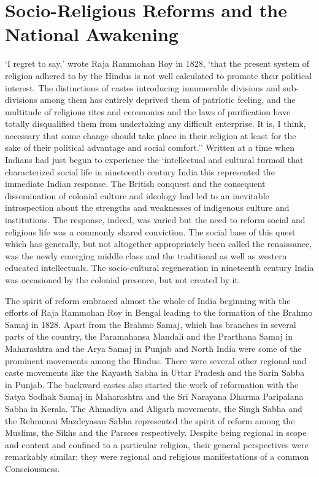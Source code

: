 
\chapter{Socio-Religious Reforms and the National Awakening}

`I regret to say,' wrote Raja Rammohan Roy in 1828, `that the present system of religion adhered to by the Hindus is not well calculated to promote their political interest. The distinctions of castes introducing innumerable divisions and sub-divisions among them has entirely deprived them of patriotic feeling, and the multitude of religious rites and ceremonies and the laws of purification have totally disqualified them from undertaking any difficult enterprise. It is, I think, necessary that some change should take place in their religion at least for the sake of their political advantage and social comfort.'' Written at a time when Indians had just begun to experience the `intellectual and cultural turmoil that characterized social life in nineteenth century India this represented the immediate Indian response. The British conquest and the consequent dissemination of colonial culture and ideology had led to an inevitable introspection about the strengths and weaknesses of indigenous culture and institutions. The response, indeed, was varied but the need to reform social and religious life was a commonly shared conviction. The social base of this quest which has generally, but not altogether appropriately been called the renaissance, was the newly emerging middle class and the traditional as well as western educated intellectuals. The socio-cultural regeneration in nineteenth century India was occasioned by the colonial presence, but not created by it.

The spirit of reform embraced almost the whole of India beginning with the efforts of Raja Rammohan Roy in Bengal leading to the formation of the Brahmo Samaj in 1828. Apart from the Brahmo Samaj, which has branches in several parts of the country, the Paramahansa Mandali and the Prarthana Samaj in Maharashtra and the Arya Samaj in Punjab and North India were some of the prominent movements among the Hindus. There were several other regional and caste movements like the Kayasth Sabha in Uttar Pradesh and the Sarin Sabba in Punjab. The backward castes also started the work of reformation with the Satya Sodhak Samaj in Maharashtra and the Sri Narayana Dharma Paripalana Sabha in Kerala. The Ahmadiya and Aligarh movements, the Singh Sabha and the Rehnumai Mazdeyasan Sabha represented the spirit of reform among the Muslims, the Sikhs and the Parsees respectively. Despite being regional in scope and content and confined to a particular religion, their general perspectives were remarkably similar; they were regional and religious manifestations of a common Consciousness.


